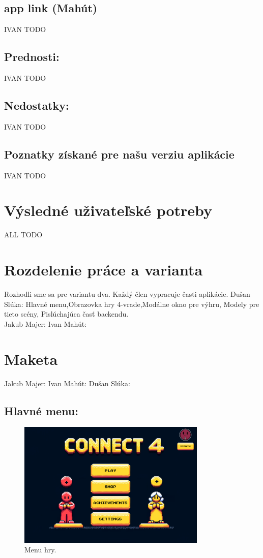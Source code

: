 \documentclass[a4paper, 11pt, onecolumn]{article}
\begin{document}
\subsection{app link (Mahút)}
IVAN TODO
\subsection*{Prednosti:}
IVAN TODO
\subsection*{Nedostatky:}
IVAN TODO
\subsection*{Poznatky získané pre našu verziu aplikácie}
IVAN TODO

\section{Výsledné uživateľské potreby}
ALL TODO

\section{Rozdelenie práce a varianta}

Rozhodli sme sa pre variantu dva. Každý člen vypracuje časti aplikácie.
Dušan Slúka: Hlavné menu,Obrazovka hry 4-vrade,Modálne okno pre výhru, Modely pre tieto scény, Pislúchajúca časť backendu.\\
Jakub Majer:
Ivan Mahút:
\section{Maketa}
Jakub Majer:
Ivan Mahút:
Dušan Slúka:
\subsection{Hlavné menu:}
\begin{figure}[H]
  \centering
  \includegraphics[width=0.8\textwidth]{Menu.png}
  \caption{ Menu hry.}
  \label{fig:menu_label}
\end{figure}
\end{document}
